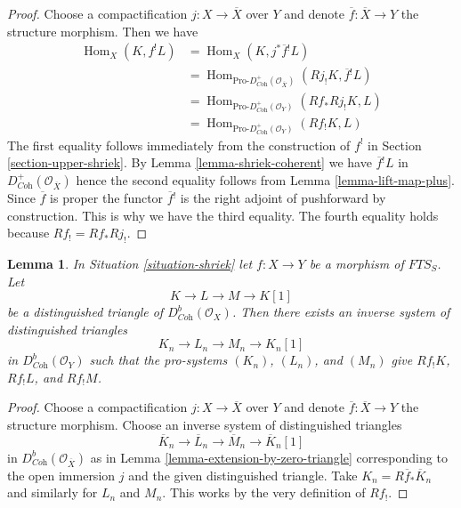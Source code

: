 \documentclass{stacks-project}
\theoremstyle{plain}
\newtheorem{lemma}[subsection]{Lemma}
\theoremstyle{definition}
\theoremstyle{remark}
\numberwithin{equation}{subsection}
\def\Hom{\mathop{\mathrm{Hom}}\nolimits}
\begin{document}
\begin{proof}
Choose a compactification $j : X \to \overline{X}$ over $Y$ and
denote $\overline{f} : \overline{X} \to Y$ the structure morphism.
Then we have
\begin{align*}
\Hom_X(K, f^!L)
& =
\Hom_X(K, j^*\overline{f}{}^!L) \\
& =
\Hom_{\text{Pro-}D^+_{\textit{Coh}}(\mathcal{O}_{\overline{X}})}
(Rj_!K, \overline{f}{}^!L) \\
& =
\Hom_{\text{Pro-}D^+_{\textit{Coh}}(\mathcal{O}_Y)}(Rf_*Rj_!K, L) \\
& =
\Hom_{\text{Pro-}D^+_{\textit{Coh}}(\mathcal{O}_Y)}(Rf_!K, L)
\end{align*}
The first equality follows immediately from the construction of $f^!$ in
Section \ref{section-upper-shriek}.
By Lemma \ref{lemma-shriek-coherent} we have $\overline{f}{}^!L$
in $D^+_{\textit{Coh}}(\mathcal{O}_{\overline{X}})$ hence the second
equality follows from Lemma \ref{lemma-lift-map-plus}.
Since $\overline{f}$ is proper the functor $\overline{f}{}^!$
is the right adjoint of pushforward by construction. This is
why we have the third equality.
The fourth equality holds because $Rf_! = Rf_* Rj_!$.
\end{proof}

\begin{lemma}
\label{lemma-compactly-supported-triangle}
In Situation \ref{situation-shriek} let $f : X \to Y$ be a morphism of
$\textit{FTS}_S$. Let
$$
K \to L \to M \to K[1]
$$
be a distinguished triangle of $D^b_{\textit{Coh}}(\mathcal{O}_X)$.
Then there exists an inverse system of distinguished triangles
$$
K_n \to L_n \to M_n \to K_n[1]
$$
in $D^b_{\textit{Coh}}(\mathcal{O}_Y)$ such that the pro-systems
$(K_n)$, $(L_n)$, and $(M_n)$ give $Rf_!K$, $Rf_!L$, and $Rf_!M$.
\end{lemma}

\begin{proof}
Choose a compactification $j : X \to \overline{X}$ over $Y$ and
denote $\overline{f} : \overline{X} \to Y$ the structure morphism.
Choose an inverse system of distinguished triangles
$$
\overline{K}_n \to \overline{L}_n \to \overline{M}_n \to \overline{K}_n[1]
$$
in $D^b_{\textit{Coh}}(\mathcal{O}_{\overline{X}})$ as in
Lemma \ref{lemma-extension-by-zero-triangle} corresponding to the
open immersion $j$ and the given distinguished triangle. Take
$K_n = R\overline{f}_*\overline{K}_n$
and similarly for $L_n$ and $M_n$. This works by the very definition
of $Rf_!$.
\end{proof}
\end{document}
